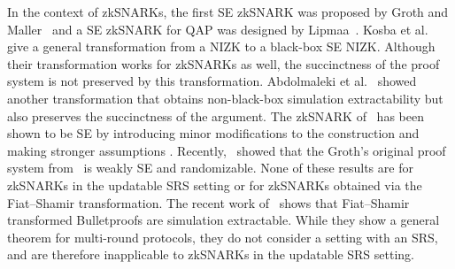 In the context of zkSNARKs, the first
SE zkSNARK was proposed by Groth and Maller~\cite{C:GroMal17} and a SE
zkSNARK for QAP was designed by Lipmaa~\cite{EPRINT:Lipmaa19a}.
Kosba et
al.~\cite{EPRINT:KZMQCP15} give a general transformation from a NIZK to a
black-box SE NIZK. Although their transformation works for zkSNARKs as well,
the succinctness of the proof system is not preserved by this transformation.
Abdolmaleki et al.~\cite{CCS:AbdRamSla20short} showed another transformation that
obtains non-black-box simulation extractability but also preserves
the succinctness of the argument. 
The zkSNARK of~\cite{EC:Groth16} has been shown to be SE by introducing minor modifications to the construction and making
stronger assumptions \cite{EPRINT:BowGab18,EPRINT:AtaBag19}. Recently,~\cite{EPRINT:BKSV20} showed that the
 Groth's original proof system from~\cite{EC:Groth16} is weakly SE and
randomizable. None of these results are for zkSNARKs in the updatable SRS setting or for zkSNARKs obtained via the Fiat--Shamir transformation. The recent work of~\cite{cryptoeprint:GOPTT22} shows that Fiat--Shamir transformed Bulletproofs are simulation extractable. While they show a general theorem for multi-round protocols, they do not consider a setting with an SRS, and are therefore inapplicable to zkSNARKs in the updatable SRS setting.



